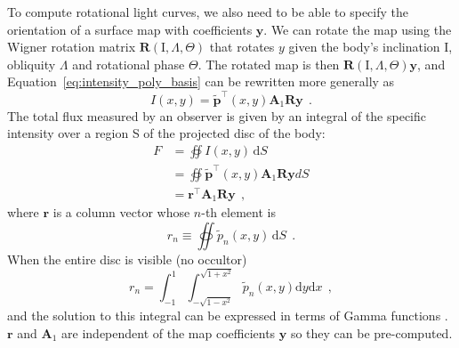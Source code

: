 \documentclass[12pt,dvipsnames]{report}
\newcommand{\ud}{\,\mathrm{d}}
\newcommand{\hquad}{~~}
\begin{document}
To compute rotational light curves, we also need to be able to specify the
orientation of a surface map with coefficients $\mathbf y$. We can rotate the
map using the Wigner rotation matrix $\mathbf{R}(\mathrm{I}, \Lambda, \Theta)$
that rotates $y$ given the body's inclination $\mathrm{I}$, obliquity $\Lambda$
and rotational phase $\Theta$. The rotated map is then $\mathbf{R}(\mathrm{I},
    \Lambda, \Theta) \mathbf{y}$, and Equation~\ref{eq:intensity_poly_basis} can be
rewritten more generally as
\begin{equation}
    I(x, y)=\tilde{\mathbf{p}}^{\intercal}(x, y) \mathbf{A}_1 \mathbf{R}\mathbf{y}
    \hquad.
\end{equation}
The total flux measured by an observer is given by an integral of the specific
intensity over a region S of the projected disc of the body:
\begin{align}
    F & =\oiint I(x, y) \ud S                                                                 \\
      & =\oiint \tilde{\mathbf{p}}^{\intercal}(x, y) \mathbf{A}_{1} \mathbf{R} \mathbf{y} d S \\
      & =\mathbf{r}^{\intercal} \mathbf{A}_{1} \mathbf{R} \mathbf{y}
      \hquad,
\end{align}
where $\mathbf{r}$ is a column vector whose $n$-th element is \citep{2019AJ....157...64L}
\begin{equation}
    r_{n} \equiv \oiint \tilde{p}_{n}(x, y) \ud S
    \hquad.
\end{equation}
When the entire disc is visible (no occultor)
\begin{equation}
    r_{n}=\int_{-1}^{1} \int_{-\sqrt{1-x^{2}}}^{\sqrt{1+x^{2}}} \tilde{p}_{n}(x, y) \mathrm{d}y \mathrm{d} x
    \hquad,
\end{equation}
and the solution to this integral can be expressed in terms of Gamma functions
\citep[Equation 20 in ][]{2019AJ....157...64L}.
$\mathbf{r}$ and $\mathbf{A}_1$ are independent of the map coefficients $\mathbf{y}$
so they can be pre-computed.
\end{document}
